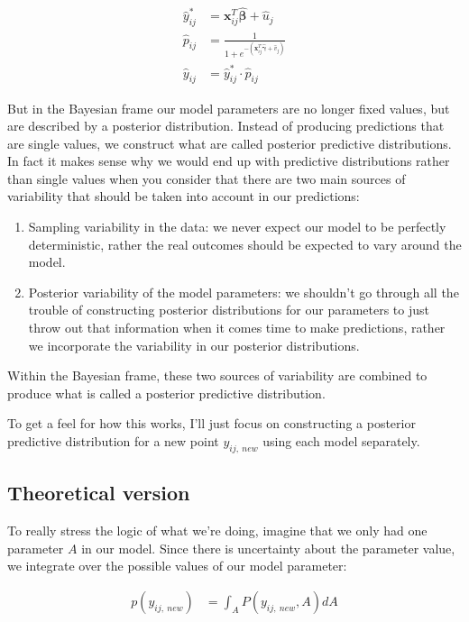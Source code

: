 \documentclass[12pt,twoside]{reedthesis}
\begin{document}
\[
\begin{aligned}
\hat{y}^*_{ij} &= \mathbf{x}_{ij}^T\hat{\boldsymbol{\beta}} + \hat{u}_j \\
\hat{p}_{ij} &= \frac{1}{1 + e^{-(\mathbf{x}_{ij}^T\hat{\boldsymbol{\gamma}} + \hat{v}_j)}} \\
\hat{y}_{ij} &= \hat{y}^*_{ij}\cdot \hat{p}_{ij}
\end{aligned}
\]

But in the Bayesian frame our model parameters are no longer fixed values, but are described by a posterior distribution. Instead of producing predictions that are single values, we construct what are called posterior predictive distributions. In fact it makes sense why we would end up with predictive distributions rather than single values when you consider that there are two main sources of variability that should be taken into account in our predictions:
\begin{enumerate}
\def\labelenumi{\arabic{enumi}.}
\item
  Sampling variability in the data: we never expect our model to be perfectly deterministic, rather the real outcomes should be expected to vary around the model.
\item
  Posterior variability of the model parameters: we shouldn't go through all the trouble of constructing posterior distributions for our parameters to just throw out that information when it comes time to make predictions, rather we incorporate the variability in our posterior distributions.
\end{enumerate}
Within the Bayesian frame, these two sources of variability are combined to produce what is called a posterior predictive distribution.

To get a feel for how this works, I'll just focus on constructing a posterior predictive distribution for a new point \(y_{ij, \ new}\) using each model separately.

\hypertarget{theoretical-version}{%
\subsection{Theoretical version}\label{theoretical-version}}

To really stress the logic of what we're doing, imagine that we only had one parameter \(A\) in our model. Since there is uncertainty about the parameter value, we integrate over the possible values of our model parameter:

\[
\begin{aligned}
p(y_{ij, \ new} ) &= \int_A P(y_{ij, \ new}, A) dA  \\
\end{aligned}
\]
\end{document}
